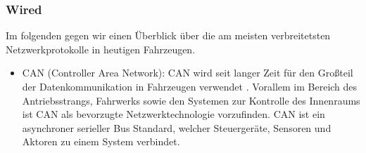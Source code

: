         \subsubsection{Wired}
        Im folgenden gegen wir einen Überblick über die am meisten verbreitetsten Netzwerkprotokolle in heutigen Fahrzeugen. 
            \begin{itemize}
                \item CAN (Controller Area Network): CAN wird seit langer Zeit für den Großteil der Datenkommunikation in Fahrzeugen verwendet \cite{leen1999digital}.
                Vorallem im Bereich des Antriebsstrangs, Fahrwerks sowie den Systemen zur Kontrolle des Innenraums ist CAN als bevorzugte Netzwerktechnologie vorzufinden.
                CAN ist ein asynchroner serieller Bus Standard, welcher Steuergeräte, Sensoren und Aktoren zu einem System verbindet. 
                

\end{itemize}
